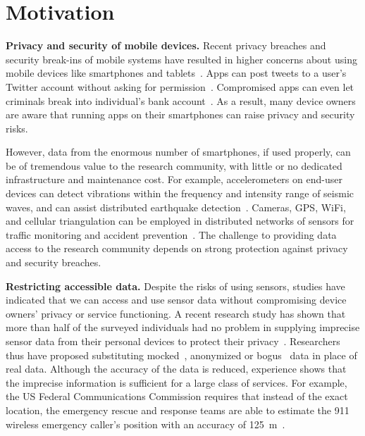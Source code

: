 \section{Motivation}\label{sec-motivation}

\textbf{Privacy and security of mobile devices.}
Recent privacy breaches and security break-ins of mobile systems 
have resulted in higher concerns about using mobile devices like 
smartphones and tablets~\cite{breach}. Apps can post tweets to a 
user's Twitter account without asking for permission~\cite{tweet}. 
Compromised apps can even let criminals break into individual's 
bank account~\cite{starbucks}. As a result, many device owners 
are aware that running apps on their smartphones can raise privacy 
and security risks. 

However, data from the enormous number of smartphones, 
if used properly, can be of tremendous value to the research 
community, with little or no dedicated infrastructure and maintenance 
cost. For example, accelerometers on end-user devices can 
detect vibrations within the frequency and intensity range of 
seismic waves, and can assist distributed earthquake 
detection~\cite{faulkner2011next}. Cameras, GPS, WiFi, and 
cellular triangulation can be employed in distributed networks 
of sensors for traffic monitoring and accident 
prevention~\cite{mohan2008nericell, thiagarajan2009vtrack}. 
The challenge to providing data access to the research community
depends on strong protection against privacy and security breaches.

\textbf{Restricting accessible data.}
Despite the risks of using sensors, 
studies have indicated that we can access and use sensor data 
without compromising device owners' privacy or service functioning.
A recent research study has shown that more than half of the 
surveyed individuals had no problem in supplying imprecise 
sensor data from their personal devices to protect their 
privacy~\cite{fawaz2014location}. Researchers thus have proposed 
substituting mocked~\cite{beresford2011mockdroid}, anonymized 
or bogus~\cite{zhou2011taming} data in place of real data. Although
the accuracy of the data is reduced, experience shows
that the imprecise information is sufficient for a large class of 
services. For example, the US Federal Communications Commission requires 
that instead of the exact location, the emergency rescue and 
response teams are able to estimate the 911 wireless emergency 
caller's position with an accuracy of 125~m~\cite{gruteser2003anonymous, 
reed1998overview}. 

